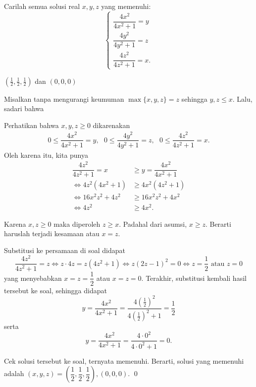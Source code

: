 \documentclass[11pt]{scrartcl}
\begin{document}
	
	\begin{soalbaru} 
		 Carilah semua solusi real  $x,y,z$ yang memenuhi: 
		 		$$\begin{cases}
		 		\dfrac{4x^2}{4x^2+1}=y \\[5pt]
		 		\dfrac{4y^2}{4y^2+1}=z \\[5pt]
		 		\dfrac{4z^2}{4z^2+1}=x.
		 		\end{cases}$$
		 		
		 \begin{jawaban}
		 $(\frac12,\frac12,\frac12)$ dan $(0,0,0)$
		 \end{jawaban}
		 \begin{solusi}
		 Misalkan tanpa mengurangi keumuman $\max\{x,y,z\}=z$ sehingga $y,z \le x$. Lalu, sadari bahwa 
		 
		 Perhatikan bahwa $x,y,z \ge 0$ dikarenakan
		 \begin{equation*}
		 		 \begin{split}
		 		 0\le\dfrac{4x^2}{4x^2+1}=y,\text{  }
		 		 0\le\dfrac{4y^2}{4y^2+1}=z,\text{  }
		 		 0\le\dfrac{4z^2}{4z^2+1}=x.
		 		 \end{split}
		 \end{equation*}
		 Oleh karena itu, kita punya
		 \begin{equation*}
		 \begin{split}
		 \dfrac{4z^2}{4z^2+1}=x &\ge y=\dfrac{4x^2}{4x^2+1}\\
		 \iff 4z^2(4x^2+1) &\ge 4x^2(4z^2+1)\\
		 \iff 16x^2z^2+4z^2 &\ge 16x^2z^2 + 4x^2\\
		 \iff 4z^2 &\ge 4x^2.
		 \end{split}
		 \end{equation*}
		 
		 Karena $x,z \ge 0$ maka diperoleh $z \ge x$. Padahal dari asumsi, $x \ge z$. Berarti haruslah terjadi kesamaan atau $x=z$. 
		 
		 Substitusi ke persamaan di soal didapat
		 $$\dfrac{4z^2}{4z^2+1}=z \iff z\cdot 4z=z(4z^2+1) \iff z(2z-1)^2=0 \iff z=\dfrac{1}{2} \text{ atau } z=0 $$
		 yang menyebabkan $x=z=\dfrac{1}{2}$ atau $x=z=0$. Terakhir, substitusi kembali hasil tersebut ke soal, sehingga didapat
		 $$y=\dfrac{4x^2}{4x^2+1}=\dfrac{4(\frac{1}{2})^2}{4(\frac{1}{2})^2+1}=\dfrac{1}{2}$$ serta $$y=\dfrac{4x^2}{4x^2+1}=\dfrac{4\cdot 0^2}{4 \cdot 0^2 +1}=0.$$
		 
		 Cek solusi tersebut ke soal, ternyata memenuhi. Berarti, solusi yang memenuhi adalah $(x,y,z)=\left(\dfrac{1}{2},\dfrac{1}{2},\dfrac{1}{2}\right),(0,0,0)$. \qed
		 \end{solusi}
	\end{soalbaru}
\end{document}

